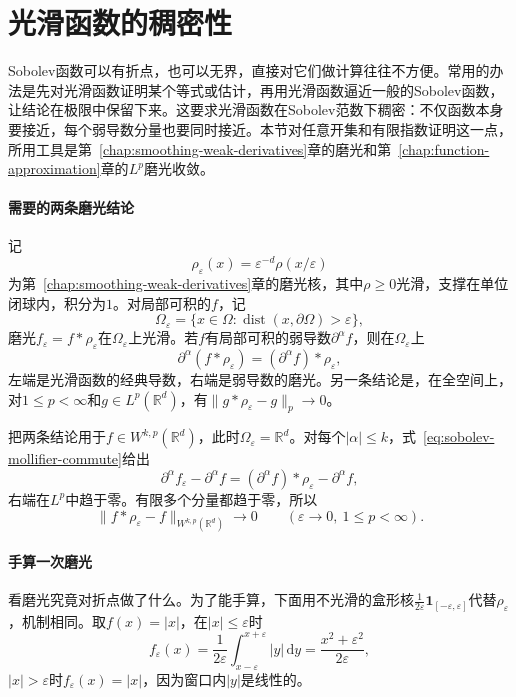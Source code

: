 \section{光滑函数的稠密性}
\label{sec:sobolev-smooth-density}

Sobolev函数可以有折点，也可以无界，直接对它们做计算往往不方便。常用的办法是先对光滑函数证明某个等式或估计，再用光滑函数逼近一般的Sobolev函数，让结论在极限中保留下来。这要求光滑函数在Sobolev范数下稠密：不仅函数本身要接近，每个弱导数分量也要同时接近。本节对任意开集和有限指数证明这一点，所用工具是第~\ref{chap:smoothing-weak-derivatives}章的磨光和第~\ref{chap:function-approximation}章的$L^p$磨光收敛。

\paragraph{需要的两条磨光结论}
记
\[
\rho_\varepsilon(x)=\varepsilon^{-d}\rho(x/\varepsilon)
\]
为第~\ref{chap:smoothing-weak-derivatives}章的磨光核，其中$\rho\geq0$光滑，支撑在单位闭球内，积分为$1$。对局部可积的$f$，记
\[
\Omega_\varepsilon=\{x\in\Omega:\operatorname{dist}(x,\partial\Omega)>\varepsilon\},
\]
磨光$f_\varepsilon=f*\rho_\varepsilon$在$\Omega_\varepsilon$上光滑。若$f$有局部可积的弱导数$\partial^\alpha f$，则在$\Omega_\varepsilon$上
\begin{equation}
\partial^\alpha(f*\rho_\varepsilon)=(\partial^\alpha f)*\rho_\varepsilon ,
\label{eq:sobolev-mollifier-commute}
\end{equation}
左端是光滑函数的经典导数，右端是弱导数的磨光。另一条结论是，在全空间上，对$1\leq p<\infty$和$g\in L^p(\mathbb R^d)$，有$\lVert g*\rho_\varepsilon-g\rVert_p\to0$。

把两条结论用于$f\in W^{k,p}(\mathbb R^d)$，此时$\Omega_\varepsilon=\mathbb R^d$。对每个$|\alpha|\leq k$，式~\eqref{eq:sobolev-mollifier-commute}给出
\[
\partial^\alpha f_\varepsilon-\partial^\alpha f=(\partial^\alpha f)*\rho_\varepsilon-\partial^\alpha f,
\]
右端在$L^p$中趋于零。有限多个分量都趋于零，所以
\begin{equation}
\lVert f*\rho_\varepsilon-f\rVert_{W^{k,p}(\mathbb R^d)}\to0\qquad(\varepsilon\to0,\ 1\leq p<\infty).
\label{eq:sobolev-whole-space-mollify}
\end{equation}

\paragraph{手算一次磨光}
看磨光究竟对折点做了什么。为了能手算，下面用不光滑的盒形核$\frac1{2\varepsilon}\mathbf 1_{[-\varepsilon,\varepsilon]}$代替$\rho_\varepsilon$，机制相同。取$f(x)=|x|$，在$|x|\leq\varepsilon$时
\[
f_\varepsilon(x)=\frac1{2\varepsilon}\int_{x-\varepsilon}^{x+\varepsilon}|y|\,\mathrm dy
=\frac{x^2+\varepsilon^2}{2\varepsilon},
\]
$|x|>\varepsilon$时$f_\varepsilon(x)=|x|$，因为窗口内$|y|$是线性的。

